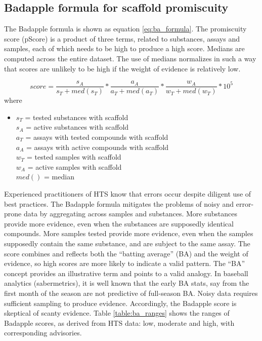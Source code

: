 \subsection{Badapple formula for scaffold promiscuity}

The Badapple formula is shown as equation \ref{eq:ba_formula}. The promiscuity score (pScore) is a product of three terms, related to substances, assays and samples, each of which needs to be high to produce a high score. Medians are computed across the entire dataset. The use of medians normalizes in such a way that scores are unlikely to be high if the weight of evidence is relatively low.

\begin{equation}
score = \frac{s_A}{s_T + med(s_T)} * \frac{a_A}{a_T + med(a_T)} * \frac{w_A}{w_T + med(w_T)} * 10^5
\label{eq:ba_formula}
\end{equation}
where \\
\begin{itemize}
\item[] $s_T$ = tested substances with scaffold \\ 
$s_A$ = active substances with scaffold \\ 
$a_T$ = assays with tested compounds with scaffold \\
$a_A$ = assays with active compounds with scaffold \\ 
$w_T$ = tested samples with scaffold \\
$w_A$ = active samples with scaffold \\
$med()$ = median
\end{itemize}

Experienced practitioners of HTS know that errors occur despite diligent use of best practices. The Badapple formula mitigates the problems of noisy and error-prone data by aggregating across samples and substances. More substances provide more evidence, even when the substances are supposedly identical compounds. More samples tested provide more evidence, even when the samples supposedly contain the same substance, and are subject to the same assay. The score combines and reflects both the “batting average” (BA) and the weight of evidence, so high scores are more likely to indicate a valid pattern. The “BA” concept provides an illustrative term and points to a valid analogy. In baseball analytics (sabermetrics), it is well known that the early BA stats, say from the first month of the season are not predictive of full-season BA\cite{Draper2013-at}. Noisy data requires sufficient sampling to produce evidence. Accordingly, the Badapple score is skeptical of scanty evidence. Table \ref{table:ba_ranges} shows the ranges of Badapple scores, as derived from HTS data: low, moderate and high, with corresponding advisories.

